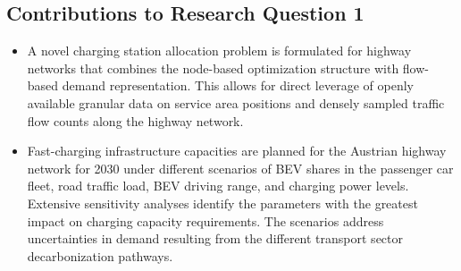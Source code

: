     \subsection{Contributions to Research Question 1}
    \begin{itemize}
    
        \item A novel charging station allocation problem is formulated for highway networks that combines the node-based optimization structure with flow-based demand representation. This allows for direct leverage of openly available granular data on service area positions and densely sampled traffic flow counts along the highway network.
        \item Fast-charging infrastructure capacities are planned for the Austrian highway network for 2030 under different scenarios of \ac{BEV} shares in the passenger car fleet, road traffic load, \ac{BEV} driving range, and charging power levels. Extensive sensitivity analyses identify the parameters with the greatest impact on charging capacity requirements. The scenarios address uncertainties in demand resulting from the different transport sector decarbonization pathways.
    \end{itemize}
